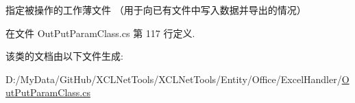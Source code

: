 指定被操作的工作薄文件 （用于向已有文件中写入数据并导出的情况） 



在文件 Out\+Put\+Param\+Class.\+cs 第 117 行定义.



该类的文档由以下文件生成\+:\begin{DoxyCompactItemize}
\item 
D\+:/\+My\+Data/\+Git\+Hub/\+X\+C\+L\+Net\+Tools/\+X\+C\+L\+Net\+Tools/\+Entity/\+Office/\+Excel\+Handler/\hyperlink{_out_put_param_class_8cs}{Out\+Put\+Param\+Class.\+cs}\end{DoxyCompactItemize}
